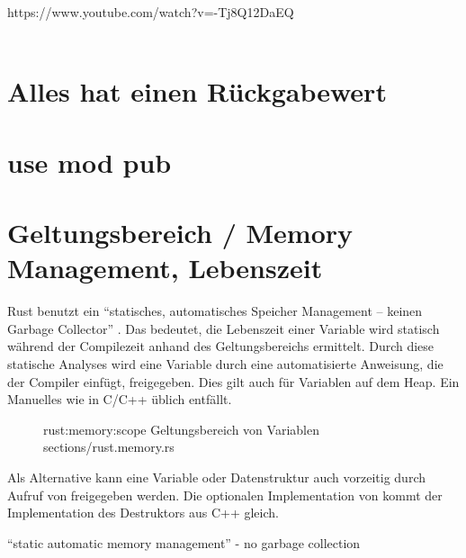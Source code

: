 


https://www.youtube.com/watch?v=-Tj8Q12DaEQ \\
 \\



\section{Alles hat einen Rückgabewert}

\section{use mod pub}


\section{Geltungsbereich / Memory Management, Lebenszeit}
\label{rust:scope}
\label{rust:static_analysis}

Rust benutzt ein \enquote{statisches, automatisches Speicher Management -- keinen Garbage Collector} \cite{rust:youtube:goto2017}.
Das bedeutet, die Lebenszeit einer Variable wird statisch während der Compilezeit anhand des Geltungsbereichs ermittelt.
Durch diese statische Analyses wird eine Variable durch eine automatisierte Anweisung, die der Compiler einfügt, freigegeben.
Dies gilt auch für Variablen auf dem Heap.
Ein Manuelles  wie in C/C++ üblich entfällt.


\begin{figure}[H]
	\rustcinclude
		{rust:memory:scope}
		{Geltungsbereich von Variablen}
		{sections/rust.memory.rs}
\end{figure}

Als Alternative kann eine Variable oder Datenstruktur auch vorzeitig durch Aufruf von  freigegeben werden.
Die optionalen Implementation von   kommt der Implementation des Destruktors aus C++ gleich.

\enquote{static automatic memory management} - no garbage collection \cite{rust:youtube:goto2017}
 \\

